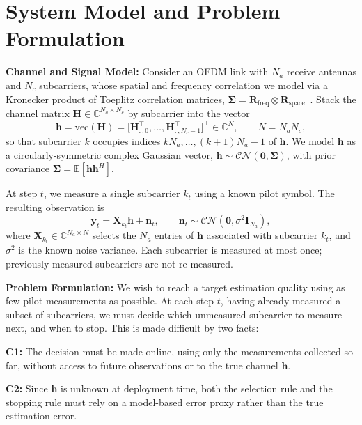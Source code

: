 \section{System Model and Problem Formulation}
\label{sec:system_model}

{\bf Channel and Signal Model:}
Consider an OFDM link with $N_a$ receive antennas and $N_c$ subcarriers, whose spatial and frequency correlation we model via a Kronecker product of Toeplitz correlation matrices, $\boldsymbol\Sigma=\mathbf R_{\mathrm{freq}}\otimes\mathbf R_{\mathrm{space}}$~\cite{yu2025lmmse}. Stack the channel matrix $\mathbf H \in \mathbb C^{N_a\times N_c}$ by subcarrier into the vector
\begin{equation}
\mathbf h = \mathrm{vec}(\mathbf H) = \bigl[\mathbf H_{:,0}^\top,\ldots,\mathbf H_{:,N_c-1}^\top\bigr]^\top \in \mathbb C^N, \qquad N = N_a N_c,
\label{eq:vecH}
\end{equation}
so that subcarrier $k$ occupies indices $kN_a,\ldots,(k{+}1)N_a{-}1$ of $\mathbf h$. We model $\mathbf h$ as a circularly-symmetric complex Gaussian vector, $\mathbf h \sim \mathcal{CN}(\mathbf 0, \boldsymbol\Sigma)$, with prior covariance $\boldsymbol\Sigma = \mathbb E[\mathbf h\mathbf h^H]$.

At step $t$, we measure a single subcarrier $k_t$ using a known pilot symbol. The resulting observation is
\begin{equation}
\mathbf y_t = \mathbf X_{k_t} \mathbf h + \mathbf n_t, \qquad \mathbf n_t \sim \mathcal{CN}(\mathbf 0, \sigma^2 \mathbf I_{N_a}),
\label{eq:obs_model}
\end{equation}
where $\mathbf X_{k_t} \in \mathbb C^{N_a \times N}$ selects the $N_a$ entries of $\mathbf h$ associated with subcarrier $k_t$, and $\sigma^2$ is the known noise variance. Each subcarrier is measured at most once; previously measured subcarriers are not re-measured.

\smallskip
\noindent
{\bf Problem Formulation:}
We wish to reach a target estimation quality using as few pilot measurements as possible. At each step $t$, having already measured a subset of subcarriers, we must decide which unmeasured subcarrier to measure next, and when to stop. This is made difficult by two facts:

\smallskip
\noindent
\textbf{C1:} The decision must be made online, using only the measurements collected so far, without access to future observations or to the true channel $\mathbf h$.

\smallskip
\noindent
\textbf{C2:} Since $\mathbf h$ is unknown at deployment time, both the selection rule and the stopping rule must rely on a model-based error proxy rather than the true estimation error.

